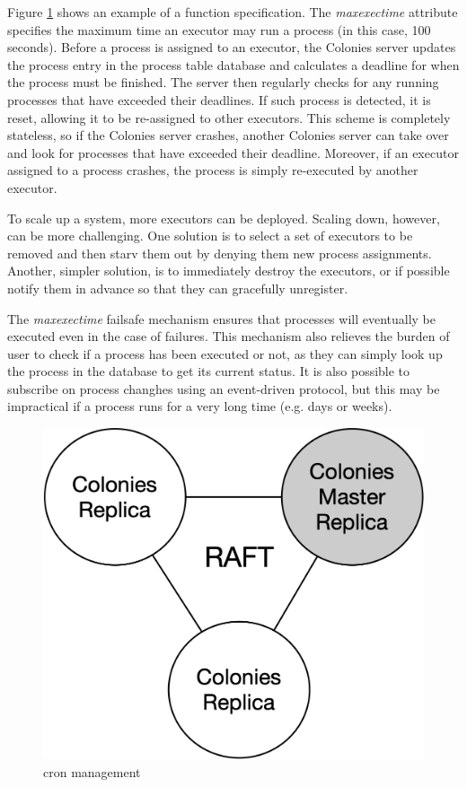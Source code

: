 \documentclass{article}
\begin{document}
Figure \ref{fig:fig2} shows an example of a function specification. The \emph{maxexectime} attribute specifies the maximum time an executor may run a process (in this case, 100 seconds). Before a process is assigned to an executor, the Colonies server updates the process entry in the process table database and calculates a deadline for when the process must be finished. The server then regularly checks for any running processes that have exceeded their deadlines. If such process is detected, it is reset, allowing it to be re-assigned to other executors. This scheme is completely stateless, so if the Colonies server crashes, another Colonies server can take over and look for processes that have exceeded their deadline. Moreover, if an executor assigned to a process crashes, the process is simply re-executed by another executor.

To scale up a system, more executors can be deployed. Scaling down, however, can be more challenging. One solution is to select a set of executors to be removed and then starv them out by denying them new process assignments. Another, simpler solution, is to immediately destroy the executors, or if possible notify them in advance so that they can gracefully unregister. 

The \emph{maxexectime} failsafe mechanism ensures that processes will eventually be executed even in the case of failures. This mechanism also relieves the burden of user to check if a process has been executed or not, as they can simply look up the process in the database to get its current status. It is also possible to subscribe on process changhes using an event-driven protocol, but this may be impractical if a process runs for a very long time (e.g. days or weeks).

\begin{figure}[h]
	\centering
    \includegraphics[scale=0.4]{raft.png}
	\caption{cron management}
	\label{fig:fig2}
\end{figure}
\end{document}
